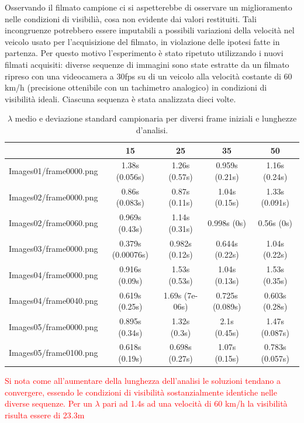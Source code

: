 \documentclass[12pt]{report}
\begin{document}
\noindent Osservando il filmato campione ci si aspetterebbe di osservare un miglioramento nelle condizioni di visibili\`a, cosa non evidente dai valori restituiti. Tali incongruenze potrebbero essere imputabili a possibili variazioni della velocit\`a nel veicolo usato per l'acquisizione del filmato, in violazione delle ipotesi fatte in partenza. Per questo motivo l'esperimento \`e stato ripetuto utilizzando i nuovi filmati acquisiti: diverse sequenze di immagini sono state estratte da un filmato ripreso con una videocamera a 30fps su di un veicolo alla velocit\`a costante di 60 km/h (precisione ottenibile con un tachimetro analogico) in condizioni di visibilit\`a ideali. Ciascuna sequenza \`e stata analizzata dieci volte.\\

\begin{table}[H]
\centering
\begin{tabular}{|c|c|c|c|c|}
	\hline
	& 15 & 25 & 35 & 50 \\ \hline
	Images01/frame0000.png & 1.38s (0.056s) & 1.26s (0.57s) & 0.959s (0.21s) & 1.16s (0.24s)\\ \hline
	Images02/frame0000.png & 0.86s (0.083s) & 0.87s (0.11s) & 1.04s (0.15s) & 1.33s (0.091s)\\ \hline
	Images02/frame0060.png & 0.969s (0.43s) & 1.14s (0.31s) & 0.998s (0s) & 0.56s (0s)\\ \hline
	Images03/frame0000.png & 0.379s (0.00076s) & 0.982s (0.12s) & 0.644s (0.22s) & 1.04s (0.22s)\\ \hline
	Images04/frame0000.png & 0.916s (0.09s) & 1.53s (0.53s) & 1.04s (0.13s) & 1.53s (0.35s)\\ \hline
	Images04/frame0040.png & 0.619s (0.25s) & 1.69s (7e-06s) & 0.725s (0.089s) & 0.603s (0.28s)\\ \hline
	Images05/frame0000.png & 0.895s (0.34s) & 1.32s (0.3s) & 2.1s (0.45s) & 1.47s (0.087s)\\ \hline
	Images05/frame0100.png & 0.618s (0.19s) & 0.698s (0.27s) & 1.07s (0.15s) & 0.783s (0.057s)\\ \hline
\end{tabular}
\caption{$\lambda$ medio e deviazione standard campionaria per diversi frame iniziali e lunghezze d'analisi.}
\end{table}

\noindent \textcolor{red}{Si nota come all'aumentare della lunghezza dell'analisi le soluzioni tendano a convergere, essendo le condizioni di visibilit\`a sostanzialmente identiche nelle diverse sequenze. Per un $\lambda$ pari ad 1.4s ad una velocit\`a di 60 km/h la visibilit\`a risulta essere di 23.3m}\\
\end{document}

